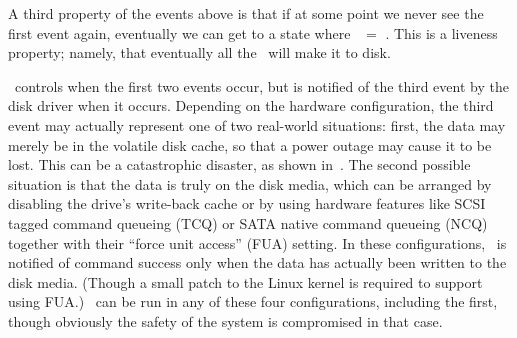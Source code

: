 A third property of the events above is that if at some point we never see the
first event again, eventually we can get to a state where \ChDisk\ $=$ \ChAll.
This is a liveness property; namely, that eventually all the \chdescs\ will make
it to disk.

\Kudos\ controls when the first two events occur, but is notified of the third
event by the disk driver when it occurs. Depending on the hardware
configuration, the third event may actually represent one of two real-world
situations: first, the data may merely be in the volatile disk cache, so that a
power outage may cause it to be lost. This can be a catastrophic disaster, as
shown in~\cite{nightingale06rethink}. The second possible situation is that the
data is truly on the disk media, which can be arranged by disabling the drive's
write-back cache or by using hardware features like SCSI tagged command queueing
(TCQ) or SATA native command queueing (NCQ) together with their ``force unit
access'' (FUA) setting. In these configurations, \Kudos\ is notified of command
success only when the data has actually been written to the disk media. (Though
a small patch to the Linux kernel is required to support using FUA.) \Kudos\ can
be run in any of these four configurations, including the first, though
obviously the safety of the system is compromised in that case.
